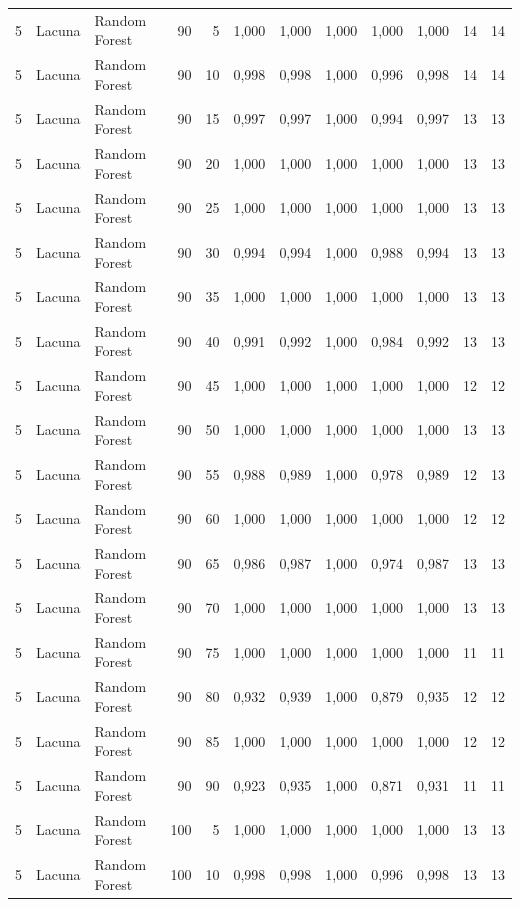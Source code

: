\begin{longtable}{@{}rllrrrrrrrrr@{}}
5 & Lacuna & Random Forest & 90 & 5 & 1,000 & 1,000 & 1,000 & 1,000 & 1,000 & 14 & 14 \\
5 & Lacuna & Random Forest & 90 & 10 & 0,998 & 0,998 & 1,000 & 0,996 & 0,998 & 14 & 14 \\
5 & Lacuna & Random Forest & 90 & 15 & 0,997 & 0,997 & 1,000 & 0,994 & 0,997 & 13 & 13 \\
5 & Lacuna & Random Forest & 90 & 20 & 1,000 & 1,000 & 1,000 & 1,000 & 1,000 & 13 & 13 \\
5 & Lacuna & Random Forest & 90 & 25 & 1,000 & 1,000 & 1,000 & 1,000 & 1,000 & 13 & 13 \\
5 & Lacuna & Random Forest & 90 & 30 & 0,994 & 0,994 & 1,000 & 0,988 & 0,994 & 13 & 13 \\
5 & Lacuna & Random Forest & 90 & 35 & 1,000 & 1,000 & 1,000 & 1,000 & 1,000 & 13 & 13 \\
5 & Lacuna & Random Forest & 90 & 40 & 0,991 & 0,992 & 1,000 & 0,984 & 0,992 & 13 & 13 \\
5 & Lacuna & Random Forest & 90 & 45 & 1,000 & 1,000 & 1,000 & 1,000 & 1,000 & 12 & 12 \\
5 & Lacuna & Random Forest & 90 & 50 & 1,000 & 1,000 & 1,000 & 1,000 & 1,000 & 13 & 13 \\
5 & Lacuna & Random Forest & 90 & 55 & 0,988 & 0,989 & 1,000 & 0,978 & 0,989 & 12 & 13 \\
5 & Lacuna & Random Forest & 90 & 60 & 1,000 & 1,000 & 1,000 & 1,000 & 1,000 & 12 & 12 \\
5 & Lacuna & Random Forest & 90 & 65 & 0,986 & 0,987 & 1,000 & 0,974 & 0,987 & 13 & 13 \\
5 & Lacuna & Random Forest & 90 & 70 & 1,000 & 1,000 & 1,000 & 1,000 & 1,000 & 13 & 13 \\
5 & Lacuna & Random Forest & 90 & 75 & 1,000 & 1,000 & 1,000 & 1,000 & 1,000 & 11 & 11 \\
5 & Lacuna & Random Forest & 90 & 80 & 0,932 & 0,939 & 1,000 & 0,879 & 0,935 & 12 & 12 \\
5 & Lacuna & Random Forest & 90 & 85 & 1,000 & 1,000 & 1,000 & 1,000 & 1,000 & 12 & 12 \\
5 & Lacuna & Random Forest & 90 & 90 & 0,923 & 0,935 & 1,000 & 0,871 & 0,931 & 11 & 11 \\
5 & Lacuna & Random Forest & 100 & 5 & 1,000 & 1,000 & 1,000 & 1,000 & 1,000 & 13 & 13 \\
5 & Lacuna & Random Forest & 100 & 10 & 0,998 & 0,998 & 1,000 & 0,996 & 0,998 & 13 & 13 \\

\end{longtable}
